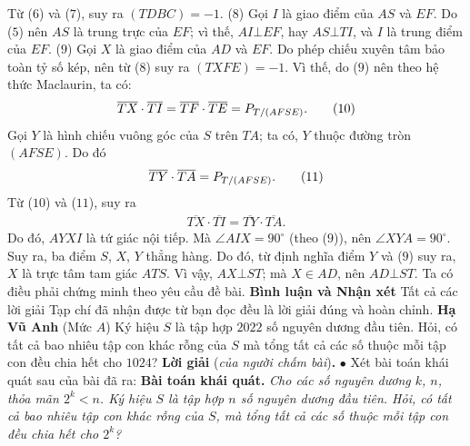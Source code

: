 \begin{multicols}{2}
	Từ ($6$) và ($7$), suy ra  $\left( {TDBC} \right) =  - 1.$            ($8$)
	\vskip 0.05cm
	Gọi $I$ là giao điểm của $AS$ và $EF$. Do ($5$) nên $AS$ là trung trực của $EF$; vì thế,  $AI \bot EF$, hay $AS \bot TI$, và $I$ là trung điểm của $EF$. \hfill ($9$)
	\vskip 0.05cm
	Gọi $X$ là giao điểm của $AD$ và $EF$.
	\vskip 0.05cm
	Do phép chiếu xuyên tâm bảo toàn tỷ số kép, nên từ ($8$) suy ra $\left( {TXFE} \right) =  - 1$.  Vì thế, do ($9$) nên theo hệ thức Maclaurin, ta có:
	\begin{align*}
		\overline {TX}  \cdot \overline {TI}  = \overline {TF}  \cdot \overline {TE}  = {P_{{T \mathord{\left/
						{\vphantom {T {\left( {AFSE} \right)}}} \right.
						\kern-\nulldelimiterspace} {\left( {AFSE} \right)}}}}.\tag{$10$}
	\end{align*}
	Gọi $Y$ là hình chiếu vuông góc của $S$ trên $TA$; ta có, $Y$ thuộc đường tròn $(AFSE)$. Do đó
	\begin{align*}
		\overline {TY}  \cdot \overline {TA}  = {P_{{T \mathord{\left/
						{\vphantom {T {\left( {AFSE} \right)}}} \right.
						\kern-\nulldelimiterspace} {\left( {AFSE} \right)}}}}. \tag{$11$}
	\end{align*}
	Từ ($10$) và ($11$), suy ra
	\begin{align*}
		\overline {TX}  \cdot \overline {TI}  = \overline {TY}  \cdot \overline {TA} .
	\end{align*}
	Do đó, $AYXI$ là tứ giác nội tiếp. Mà $\angle AIX = {90^{\circ}}$  (theo ($9$)), nên $\angle XYA = {90^{\circ}}$.  Suy ra, ba điểm $S$, $X$, $Y$ thẳng hàng. Do đó, từ định nghĩa điểm $Y$ và ($9$) suy ra, $X$ là trực tâm tam giác $ATS$. Vì vậy, $AX \bot ST$; mà $X \in AD$, nên $AD \bot ST$.
	\vskip 0.05cm
	Ta có điều phải chứng minh theo yêu cầu đề bài.
	\vskip 0.05cm
	\textbf{\color{thachthuctoanhoc}Bình luận và Nhận xét}
	\vskip 0.05cm
	Tất cả các lời giải Tạp chí đã nhận được từ bạn đọc đều là lời giải đúng và hoàn chỉnh.
	\vskip 0.05cm
	\hfill	\textbf{\color{thachthuctoanhoc}Hạ Vũ Anh}
	\vskip 0.05cm
	{}
	(Mức $A$) Ký hiệu $S$ là tập hợp $2022$ số nguyên dương đầu tiên. Hỏi, có tất cả bao nhiêu tập con khác rỗng của $S$ mà tổng tất cả các số thuộc mỗi tập con đều chia hết cho $1024$?
	\vskip 0.05cm
	\textbf{\color{thachthuctoanhoc}Lời giải} (\textit{của người chấm bài})\textbf{\color{thachthuctoanhoc}.}
	\vskip 0.05cm
	$\bullet$ Xét bài toán khái quát sau của bài đã ra:
	\vskip 0.05cm
	\textbf{\color{thachthuctoanhoc}Bài toán khái quát.} \textit{Cho các số nguyên dương $k$, $n$, thỏa mãn $2^k < n$. Ký hiệu $S$ là tập hợp $n$ số nguyên dương đầu tiên. Hỏi, có tất cả bao nhiêu tập con khác rỗng của $S$, mà tổng tất cả các số thuộc mỗi tập con đều chia hết cho  $2^k$?}

\end{multicols}
